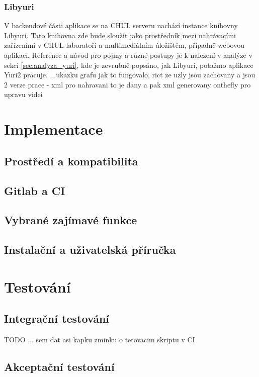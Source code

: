 \documentclass[thesis=M,czech]{FITthesis}[2012/06/26]
\begin{document}
\subsection{Libyuri} \label{subsec:navrh_backend_libyuri}
V backendové části aplikace se na CHUL serveru nachází instance knihovny Libyuri. Tato knihovna zde bude sloužit jako prostředník mezi nahrávacími zařízeními v CHUL laboratoři a multimediálním úložištěm, případně webovou aplikací. Reference a návod pro pojmy a různé postupy je k nalezení v analýze v sekci \ref{sec:analyza_yuri}, kde je zevrubně popsáno, jak Libyuri, potažmo aplikace Yuri2 pracuje.
...ukazku grafu jak to fungovalo, rict ze uzly jsou zachovany a jsou 2 verze prace - xml  pro nahravani to je dany a pak xml generovany onthefly pro upravu videi


\chapter{Implementace} \label{chap:impl}
\section{Prostředí a kompatibilita} \label{sec:impl_prostredi}

\section{Gitlab a CI} \label{sec:impl_gitlab}

\section{Vybrané zajímavé funkce} \label{sec:impl_funkce}

\section{Instalační a uživatelská příručka} \label{sec:impl_prirucka}




\chapter{Testování} \label{chap:testovani}
\section{Integrační testování} \label{sec:testovani_integracni}	
TODO ... sem dat asi kapku zminku o tetovacim skriptu v CI
\section{Akceptační testování} \label{sec:testovani_akceptacni}
\end{document}
